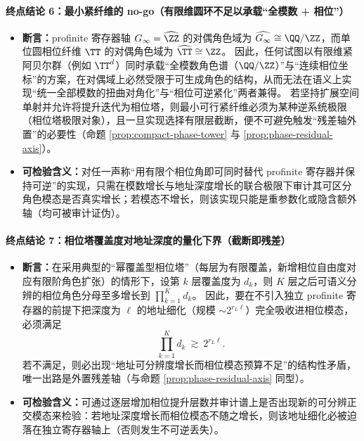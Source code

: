 \paragraph{终点结论 6：最小紧纤维的 no-go（有限维圆环不足以承载“全模数 + 相位”）}
\begin{itemize}
  \item \textbf{断言：}profinite 寄存器轴 \(G_\infty=\widehat{\ZZ}\) 的对偶角色域为 \(\widehat{G_\infty}\cong\QQ/\ZZ\)，而单位圆相位纤维 \(\TT\) 的对偶角色域为 \(\widehat{\TT}\cong\ZZ\)。
  因此，任何试图以有限维紧阿贝尔群（例如 \(\TT^d\)）同时承载“全模数角色谱（\(\QQ/\ZZ\)）”与“连续相位坐标”的方案，在对偶域上必然受限于可生成角色的结构，从而无法在语义上实现“统一全部模数的扭曲对角化”与“相位可逆紧化”两者兼得。
  若坚持扩展空间单射并允许将提升迭代为相位塔，则最小可行紧纤维必须为某种逆系统极限（相位塔极限对象），且一旦实现选择有限层截断，便不可避免触发“残差轴外置”的必要性（命题 \ref{prop:compact-phase-tower} 与 \ref{prop:phase-residual-axis}）。
  \item \textbf{可检验含义：}对任一声称“用有限个相位角即可同时替代 profinite 寄存器并保持可逆”的实现，只需在模数增长与地址深度增长的联合极限下审计其可区分角色模态是否真实增长；若模态不增长，则该实现只能是重参数化或隐含额外轴（均可被审计证伪）。
\end{itemize}

\paragraph{终点结论 7：相位塔覆盖度对地址深度的量化下界（截断即残差）}
\begin{itemize}
  \item \textbf{断言：}在采用典型的“幂覆盖型相位塔”（每层为有限覆盖，新增相位自由度对应有限阶角色扩张）的情形下，设第 \(k\) 层覆盖度为 \(d_k\)，则 \(K\) 层之后可语义分辨的相位角色分母至多增长到 \(\prod_{k=1}^{K}d_k\)。
  因此，要在不引入独立 profinite 寄存器的前提下把深度为 \(\ell\) 的地址细化（规模 \(\sim 2^{r_L\ell}\)）完全吸收进相位模态，必须满足
  \[
  \prod_{k=1}^{K}d_k\ \gtrsim\ 2^{r_L\ell}.
  \]
  若不满足，则必出现“地址可分辨度增长而相位模态预算不足”的结构性矛盾，唯一出路是外置残差轴（与命题 \ref{prop:phase-residual-axis} 同型）。
  \item \textbf{可检验含义：}可通过逐层增加相位提升层数并审计谱上是否出现新的可分辨正交模态来检验：若地址深度增长而相位模态不随之增长，则该地址细化必被迫落在独立寄存器轴上（否则发生不可逆丢失）。
\end{itemize}

